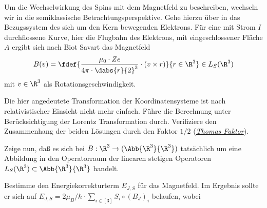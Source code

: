 \documentclass{subfiles}
\begin{document}

    Um die Wechselwirkung des Spins mit dem Magnetfeld zu beschreiben, wechseln wir in die semiklassische Betrachtungsperspektive. Gehe hierzu über in das Bezugssystem des sich um den Kern bewegenden Elektrons. Für eine mit Strom $I$ durchflossene Kurve, hier die Flugbahn des Elektrons, mit eingeschlossener Fläche $A$ ergibt sich nach Biot Savart das Magnetfeld
    \[
        B(v) = \fdef{
            \frac{\mu_0\cdot Ze}{4\pi\cdot \dabs{r}{2}^3}\cdot(v \times r)
        }{r\in\R^3}\in L_S(\R^3)
    \]
    mit $v\in\R^3$ als Rotationsgeschwindigkeit.  
    \begin{Aufgabe}
        \nr{} Die hier angedeutete Transformation der Koordinatensysteme ist nach relativistischer Einsicht nicht mehr einfach. Führe die Berechnung unter Berücksichtigung der Lorentz Transformation durch. Verifiziere den Zusammenhang der beiden Lösungen durch den Faktor $1/2$ (\href{https://en.wikipedia.org/wiki/Thomas_precession}{\emph{Thomas Faktor}}). 

        \nr{} Zeige nun, daß es sich bei $B:\R^3\to(\Abb{\R^3}{\R^3})$ tatsächlich um eine Abbildung in den Operatorraum der linearen stetigen Operatoren $L_S(\R^3)\subset\Abb{\R^3}{\R^3}$ handelt.

         Bestimme den Energiekorrekturterm $E_{J,S}$ für das Magnetfeld. Im Ergebnis sollte er sich auf $E_{J,S} = 2\mu_B/\hbar\cdot \sum_{i\in[3]}S_i\circ (B_J)_i$ belaufen, wobei 
    \end{Aufgabe}
    
\end{document}
